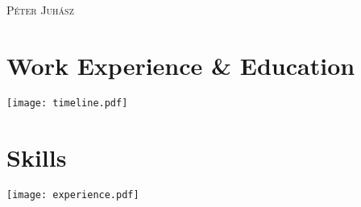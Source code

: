 \documentclass[a4paper, oneside, final]{scrartcl} %
\begin{document}
\begin{center} %


{\fontsize{36}{36}\selectfont\scshape Péter Juhász} %

\vspace{1cm} %


\section{Work Experience \& Education}

\texttt{[image: timeline.pdf]}


\section{Skills}

\texttt{[image: experience.pdf]}


\end{center}
\end{document}
